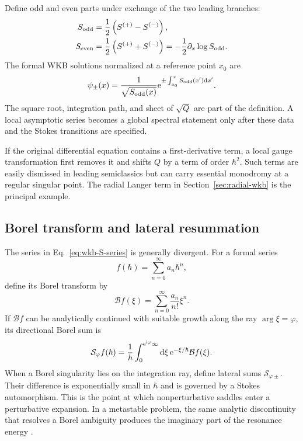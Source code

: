 Define odd and even parts under exchange of the two leading branches:
\begin{align}
  S_{\mathrm{odd}}
  &=\frac{1}{2}\left(S^{(+)}-S^{(-)}\right),
  \notag\\
  S_{\mathrm{even}}
  &=\frac{1}{2}\left(S^{(+)}+S^{(-)}\right)
  =-\frac{1}{2}\partial_x\log S_{\mathrm{odd}} .
  \label{eq:wkb-odd-even}
\end{align}
The formal WKB solutions normalized at a reference point $x_0$ are
\begin{equation}
  \psi_{\pm}(x)
  =\frac{1}{\sqrt{S_{\mathrm{odd}}(x)}}
  \mathrm{e}^{
  \pm\int_{x_0}^{x}S_{\mathrm{odd}}(x')\mathrm{d} x'
  } .
  \label{eq:formal-wkb-solutions}
\end{equation}
The square root, integration path, and sheet of $\sqrt Q$ are part of the
definition.  A local asymptotic series becomes a global spectral statement
only after these data and the Stokes transitions are specified.

If the original differential equation contains a first-derivative term, a
local gauge transformation first removes it and shifts $Q$ by a term of order
$\hbar^2$.  Such terms are easily dismissed in leading semiclassics but can
carry essential monodromy at a regular singular point.  The radial Langer term
in Section~\ref{sec:radial-wkb} is the principal example.

\subsection{Borel transform and lateral resummation}
\label{subsec:borel-resummation}

The series in Eq.~\eqref{eq:wkb-S-series} is generally divergent.  For a
formal series
\begin{equation}
  f(\hbar)=\sum_{n=0}^{\infty}a_n\hbar^n,
  \label{eq:formal-series}
\end{equation}
define its Borel transform by
\begin{equation}
  \mathcal Bf(\xi)
  =\sum_{n=0}^{\infty}\frac{a_n}{n!}\xi^n .
  \label{eq:borel-transform}
\end{equation}
If $\mathcal Bf$ can be analytically continued with suitable growth along the
ray $\arg\xi=\varphi$, its directional Borel sum is
\begin{equation}
  \mathcal S_{\varphi}f(\hbar)
  =\frac{1}{\hbar}
  \int_{0}^{\mathrm{e}^{\mathrm{i}\varphi}\infty}
  \mathrm{d}\xi\,
  \mathrm{e}^{-\xi/\hbar}\mathcal Bf(\xi) .
  \label{eq:borel-sum}
\end{equation}
When a Borel singularity lies on the integration ray, define lateral sums
$\mathcal S_{\varphi\pm}$.  Their difference is exponentially small in
$\hbar$ and is governed by a Stokes automorphism.  This is the point at which
nonperturbative saddles enter a perturbative expansion.  In a metastable
problem, the same analytic discontinuity that resolves a Borel ambiguity
produces the imaginary part of the resonance energy
\cite{Bogomolny:1980ur,Zinn-Justin:1981qzi,Dunne:2002rq,
Dunne:2015eaa}.

